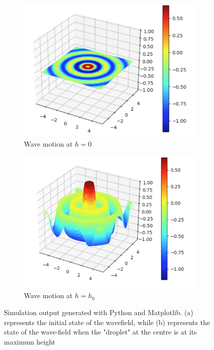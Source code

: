 \begin{figure}[h]
    \begin{subfigure}{0.5\textwidth}
        \centering
        \includegraphics[width=\linewidth]{simulation/basich0.png}
        \caption{Wave motion at $h=0$}
    \end{subfigure}
    \begin{subfigure}{0.5\textwidth}
        \centering
        \includegraphics[width=\linewidth]{simulation/basichmax.png}
        \caption{Wave motion at $h=h_0$}
    \end{subfigure}
\caption{Simulation output generated with Python and Matplotlib. (a) represents the initial state of the wavefield, while (b) represents the state of the wave-field when the "droplet" at the centre is at its maximum height}
\label{fig:basicAnimation}
\end{figure}


